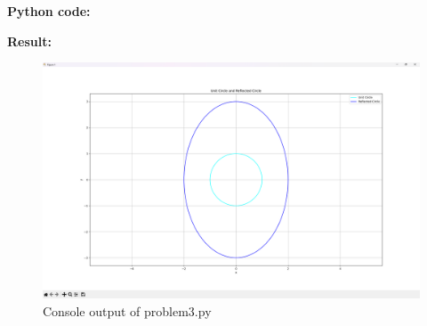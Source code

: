 \textbf{Python code:}


\clearpage

\textbf{Result:}
\begin{figure}[H]
    \centering
    \includegraphics[width=16cm]{graphics/3.png}
    \caption{Console output of problem3.py}
\end{figure}
